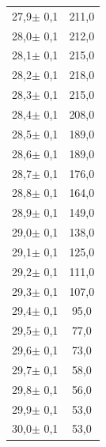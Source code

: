 \documentclass[titlepage = firstcover]{scrartcl}
\begin{document}
\begin{table}
\begin{tabular} {c c}
                27,9$\pm$ 0,1 & 	211,0   \\
                28,0$\pm$ 0,1 & 	212,0   \\
                28,1$\pm$ 0,1 & 	215,0   \\
                28,2$\pm$ 0,1 & 	218,0   \\
                28,3$\pm$ 0,1 & 	215,0   \\
                28,4$\pm$ 0,1 & 	208,0   \\
                28,5$\pm$ 0,1 & 	189,0   \\
                28,6$\pm$ 0,1 & 	189,0   \\
                28,7$\pm$ 0,1 & 	176,0   \\
                28,8$\pm$ 0,1 & 	164,0   \\
                28,9$\pm$ 0,1 & 	149,0   \\
                29,0$\pm$ 0,1 & 	138,0   \\
                29,1$\pm$ 0,1 & 	125,0   \\
                29,2$\pm$ 0,1 & 	111,0   \\
                29,3$\pm$ 0,1 & 	107,0   \\
                29,4$\pm$ 0,1 & 	95,0    \\
                29,5$\pm$ 0,1 & 	77,0    \\
                29,6$\pm$ 0,1 & 	73,0    \\
                29,7$\pm$ 0,1 & 	58,0    \\
                29,8$\pm$ 0,1 & 	56,0    \\
                29,9$\pm$ 0,1 & 	53,0    \\
                30,0$\pm$ 0,1 & 	53,0    \\
                \bottomrule  
              \end{tabular}
            \end{table}
            \FloatBarrier

            \newpage
\end{document}
